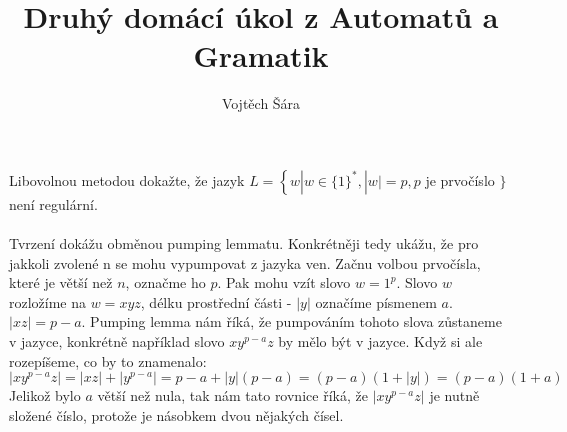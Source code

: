 \documentclass{article}
\title{Druhý domácí úkol z Automatů a Gramatik}
\author{Vojtěch Šára}
\begin{document}
\maketitle
Libovolnou metodou dokažte, že jazyk $L=\left\{w\left|w \in\{1\}^{*},\right| w \mid=p, p\right.$ je prvočíslo $\}$ není regulární.\\\\
Tvrzení dokážu obměnou pumping lemmatu. Konkrétněji tedy ukážu, že pro jakkoli zvolené n se mohu vypumpovat z jazyka ven.
Začnu volbou prvočísla, které je větší než $n$, označme ho $p$. Pak mohu vzít slovo $w = 1^{p}$. Slovo $w$ rozložíme na $w=xyz$, délku
prostřední části - $|y|$ označíme písmenem $a$. $|xz| = p - a$. Pumping lemma nám říká, že pumpováním tohoto slova zůstaneme v jazyce,
konkrétně například slovo $xy^{p-a}z$ by mělo být v jazyce. Když si ale rozepíšeme, co by to znamenalo:
$$|xy^{p-a}z| = |xz| + |y^{p-a}| = p-a + |y|(p-a) = (p-a)(1+|y|) = (p-a)(1+a)$$
Jelikož bylo $a$ větší než nula, tak nám tato rovnice říká, že $|xy^{p-a}z|$ je nutně složené číslo, protože je násobkem dvou nějakých
čísel.
\end{document}
